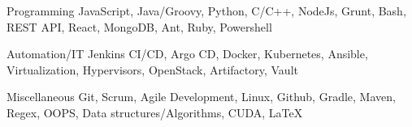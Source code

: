 

\begin{cvskills}

  \cvskill
    {Programming} %
    {JavaScript, Java/Groovy, Python, C/C++, NodeJs, Grunt, Bash, REST API, React, MongoDB, Ant, Ruby, Powershell} %

  \cvskill
    {Automation/IT} %
    {Jenkins CI/CD, Argo CD, Docker, Kubernetes, Ansible, Virtualization, Hypervisors, OpenStack, Artifactory, Vault} %

  \cvskill
    {Miscellaneous} %
    {Git, Scrum, Agile Development, Linux, Github, Gradle, Maven, Regex, OOPS, Data structures/Algorithms, CUDA, \LaTeX} %

\end{cvskills}

\vspace{-1mm}